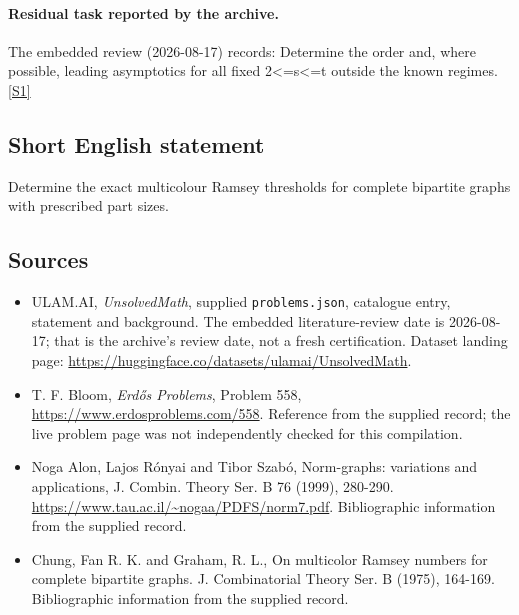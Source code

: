 \documentclass[11pt,a4paper]{article}
\newcommand{\sref}[2]{\hyperlink{source:#1:#2}{[S#2]}}
\begin{document}
\paragraph{Residual task reported by the archive.}

The embedded review (2026-08-17) records: Determine the order and, where possible, leading asymptotics for all fixed 2<=s<=t outside the known regimes. \sref{statement}{1}

\subsection{Short English statement}

Determine the exact multicolour Ramsey thresholds for complete bipartite graphs with prescribed part sizes.

\subsection{Sources}

{\small

\begin{itemize}

\item[\hypertarget{source:statement:1}{S1}] ULAM.AI, \emph{UnsolvedMath}, supplied \texttt{problems.json}, catalogue entry, statement and background. The embedded literature-review date is 2026-08-17; that is the archive’s review date, not a fresh certification. Dataset landing page: \url{https://huggingface.co/datasets/ulamai/UnsolvedMath}.

\item[\hypertarget{source:statement:2}{S2}] T. F. Bloom, \emph{Erdős Problems}, Problem 558, \url{https://www.erdosproblems.com/558}. Reference from the supplied record; the live problem page was not independently checked for this compilation.

\item[\hypertarget{source:statement:3}{S3}] Noga Alon, Lajos Rónyai and Tibor Szabó, Norm-graphs: variations and applications, J. Combin. Theory Ser. B 76 (1999), 280-290. \url{https://www.tau.ac.il/~nogaa/PDFS/norm7.pdf}. Bibliographic information from the supplied record.

\item[\hypertarget{source:statement:4}{S4}] Chung, Fan R. K. and Graham, R. L., On multicolor Ramsey numbers for complete bipartite graphs. J. Combinatorial Theory Ser. B (1975), 164-169. Bibliographic information from the supplied record.

\end{itemize}

}

\label{end:statement}
\end{document}
